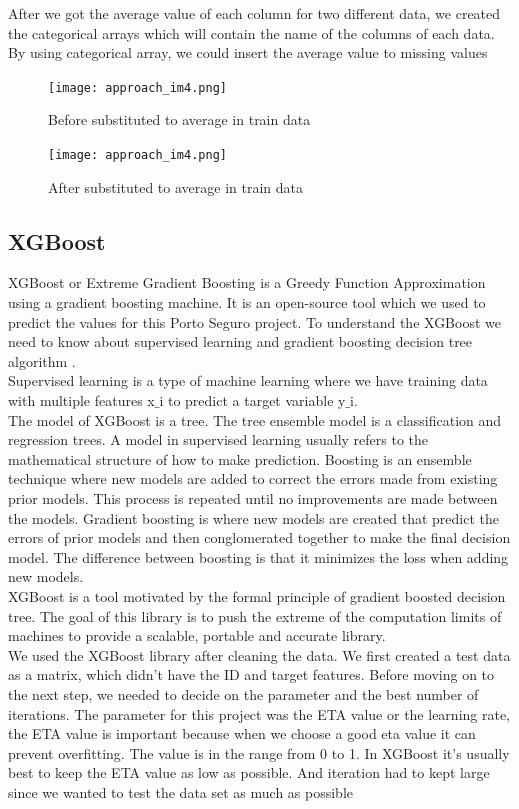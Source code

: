 \documentclass[fleqn,10pt]{SelfArx} %
\begin{document}
After we got the average value of each column for two different data, we created the categorical arrays which will contain the name of the columns of each data. By using categorical array, we could insert the average value to missing values
\begin{figure}[h]
\texttt{[image: approach\_im4.png]}
\caption{Before substituted to average in train data}
\end{figure}

\begin{figure}[h]
\texttt{[image: approach\_im4.png]}
\caption{After substituted to average in train data}
\end{figure}

\subsection{XGBoost}
\hspace{\parindent} XGBoost or Extreme Gradient Boosting is a Greedy Function Approximation using a gradient boosting machine. It is an open-source tool which we used to predict the values for this Porto Seguro project. To understand the XGBoost we need to know about supervised learning and gradient boosting decision tree algorithm .
\\ Supervised learning is a type of machine learning where we have training data with multiple features x$\_$i  to predict a target variable y$\_$i. \\
The model of XGBoost is a tree. The tree ensemble model is a classification and regression trees. A model in supervised learning usually refers to the mathematical structure of how to make prediction. 
Boosting is an ensemble technique where new models are added to correct the errors made from existing prior models. This process is repeated until no improvements are made between the models.
Gradient boosting is where new models are created that predict the errors of prior models and then conglomerated together to make the final decision model. The difference between boosting is that it minimizes the loss when adding new models. 
\\ XGBoost is a tool motivated by the formal principle of gradient boosted decision tree. The goal of this library is to push the extreme of the computation limits of machines to provide a scalable, portable and accurate library.
\\ We used the XGBoost library after cleaning the data. We first created a test data as a matrix, which didn’t have the ID and target features. Before moving on to the next step, we needed to decide on the parameter and the best number of iterations. The parameter for this project was the ETA value or the learning rate, the ETA value is important because when we choose a good eta value it can prevent overfitting. The value is in the range from 0 to 1. In XGBoost it’s usually best to keep the ETA value as low as possible. And iteration had to kept large since we wanted to test the data set as much as possible
\end{document}
